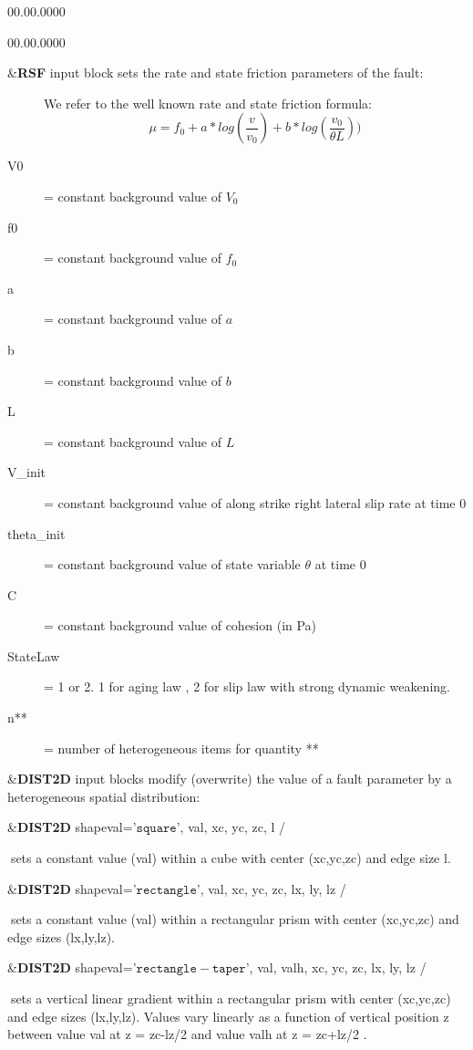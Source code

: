 \begin{lyxlist}{00.00.0000}
\begin{lyxlist}{00.00.0000}
\item [{\&\textbf{RSF}}] input block sets the rate and state friction parameters
of the fault:
\begin{description}
  \item []
    We refer to the well known rate and state friction formula:
    $$\mu = f_0 + a* log(\frac{v}{v_0}) + b* log(\frac{v_0}{\theta L}))  $$
\item [{V0}] = constant background value of $V_0$
\item [{f0}] = constant background value of $f_0$
\item [{a}] = constant background value of $a$
\item [{b}] = constant background value of $b$
\item [{L}] = constant background value of $L$
\item [{V\_init}] = constant background value of along strike right lateral slip rate at time 0
\item [{theta\_init}] = constant background value of state variable $\theta$ at time 0
\item [{C}] = constant background value of cohesion (in Pa)
\item [{StateLaw}] = 1 or 2. 1 for aging law , 2 for slip law with strong dynamic weakening.
\item [{n**}] = number of heterogeneous items for quantity **
\end{description}

\item [{\&\textbf{DIST2D}}] input blocks modify (overwrite) the value of
a fault parameter by a heterogeneous spatial distribution:

\&\textbf{DIST2D} shapeval='$\mathtt{square}$', val, xc, yc, zc, l /


$\;$sets a constant value (val) within a cube with center (xc,yc,zc)
and edge size l.


\&\textbf{DIST2D} shapeval='$\mathtt{rectangle}$', val, xc, yc, zc,
lx, ly, lz /


$\;$sets a constant value (val) within a rectangular prism with center
(xc,yc,zc) and edge sizes (lx,ly,lz).


\&\textbf{DIST2D} shapeval='$\mathtt{rectangle-taper}$', val, valh,
xc, yc, zc, lx, ly, lz /


$\;$sets a vertical linear gradient within a rectangular prism with
center (xc,yc,zc) and edge sizes (lx,ly,lz). Values vary linearly
as a function of vertical position z between value val at z = zc-lz/2
and value valh at z = zc+lz/2 .



\end{lyxlist}
\end{lyxlist}
